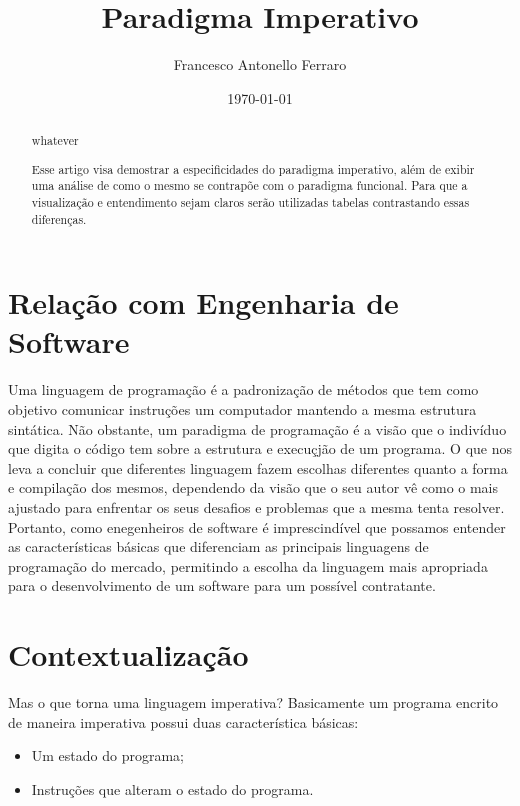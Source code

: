 \documentclass[11pt]{article}
\author{Francesco Antonello Ferraro}
\date{\today}
\title{Paradigma Imperativo}
\begin{document}
\maketitle
{}
\begin{abstract}
whatever
\end{abstract}
\begin{abstract}
Esse artigo visa demostrar a especificidades do paradigma imperativo, além de exibir uma análise de como o mesmo se contrapõe com o paradigma funcional. Para que a visualização e entendimento sejam claros serão utilizadas tabelas contrastando essas diferenças.
\end{abstract}



\section{Relação com Engenharia de Software}
\label{sec:orga62fccb}

Uma linguagem de programação é a padronização de métodos que tem como objetivo comunicar instruções um computador mantendo a mesma estrutura sintática. Não obstante, um paradigma de programação é a visão que o indivíduo que digita o código tem sobre a estrutura e execuçjão de um programa. O que nos leva a concluir que diferentes linguagem fazem escolhas diferentes quanto a forma e compilação dos mesmos, dependendo da visão que o seu autor vê como o mais ajustado para enfrentar os seus desafios e problemas que a mesma tenta resolver. Portanto, como enegenheiros de software é imprescindível que possamos entender as características básicas que diferenciam as principais linguagens de programação do mercado, permitindo a escolha da linguagem mais apropriada para o desenvolvimento de um software para um possível contratante.

\section{Contextualização}
\label{sec:orgf4a1de4}

Mas o que torna uma linguagem imperativa? Basicamente um programa encrito de maneira imperativa possui duas característica básicas:

\begin{itemize}
\item Um estado do programa;
\item Instruções que alteram o estado do programa.
\end{itemize}
\end{document}
